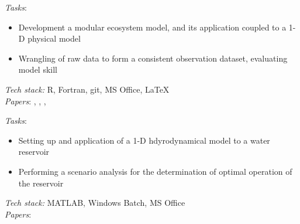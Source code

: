 \documentclass[
	a4paper,
]{fortysecondscv}
\begin{document}
\begin{cvtable}[1.0]
	{\href{https://www.inrae.fr/en}{\color{pblue}{INRAe, France}}}
	{\textit{Tasks}:
	\begin{itemize}[topsep=0pt,itemsep=0pt,partopsep=0pt, parsep=0pt, leftmargin=*]
     \item Development a modular ecosystem model, and its application coupled to a 1-D physical model
     \item Wrangling of raw data to form a consistent observation dataset, evaluating model skill 
    \end{itemize}
      \textit{Tech stack:} R, Fortran, git, MS Office, \LaTeX \\
      \textit{Papers}:
      \href{https://doi.org/10.1111/fwb.12444}{\color{pblue}{1}}, %
      \href{https://doi.org/10.1007/s10021-014-9837-6}{\color{pblue}{2}}, %
      \href{https://doi.org/10.1016/j.ecolmodel.2017.06.005}{\color{pblue}{3}}, %
      \href{https://doi.org/10.1016/j.envsoft.2017.11.016}{\color{pblue}{4}} %
      }       

	{\href{https://www.ufz.de/en}{\color{pblue}{UFZ, Germany}}}
	{\textit{Tasks}:
	\begin{itemize}[topsep=0pt,itemsep=0pt,partopsep=0pt, parsep=0pt, leftmargin=*]
     \item Setting up and application of a 1-D hdyrodynamical model to a water reservoir
     \item Performing a scenario analysis for the determination of optimal operation of the reservoir
    \end{itemize}
      \textit{Tech stack:} MATLAB, Windows Batch, MS Office \\
      \textit{Papers}:
      \href{https://doi.org/10.1002/2013WR013520}{\color{pblue}{1}} %
      }
      

\end{cvtable}
\end{document}
